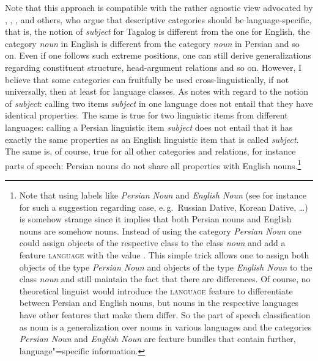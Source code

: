 Note that this approach is compatible with the rather agnostic view advocated by
\citet{Haspelmath2010a}, \citet{Dryer97a-u}, \citet[Section~1.4.2--1.4.3]{Croft2001a}, and others, who argue that descriptive categories should be
language-specific, that is, the notion of \emph{subject} for Tagalog is different from the one for English,
the category \emph{noun} in English is different from the category \emph{noun} in Persian and so on. Even if one
follows such extreme positions, one can still derive generalizations regarding constituent structure,
head-argument relations and so on. However, I believe that some categories can fruitfully be used
cross-linguistically, if not universally, then at least for language classes. As \citet[]{Newmeyer2010a} notes with regard to the notion of \emph{subject}: calling two items \emph{subject}
in one language does not entail that they have identical properties. The same is true for two
linguistic items from different languages: calling a Persian linguistic item \emph{subject} does not entail
that it has exactly the same properties as an English linguistic item that is called
\emph{subject}. The same is, of course, true for all other categories and relations, for instance parts of speech:
Persian nouns do not share all properties with English nouns.\footnote{
  Note that using labels like \emph{Persian Noun} and \emph{English Noun} (see for instance
   for such a suggestion regarding case, e.\,g.\ Russian Dative,
  Korean Dative, \ldots) is somehow strange since
  it implies that both Persian nouns and English nouns are somehow nouns. Instead of using the
  category \emph{Persian Noun} one could assign objects of the respective class to the class
  \emph{noun} and add a feature \textsc{language} with the value . This simple trick
  allows one to assign both objects of the type \emph{Persian Noun} and objects of the type
  \emph{English Noun} to the class \emph{noun} and still maintain the fact that there are
  differences. Of course, no theoretical linguist would introduce the \textsc{language} feature to
  differentiate between Persian and English nouns, but nouns in the respective languages have other features that
  make them differ. So the part of speech classification as noun is a generalization over nouns in
  various languages and the categories \emph{Persian Noun} and \emph{English Noun} are feature
  bundles that contain further, language"=specific information.

}
